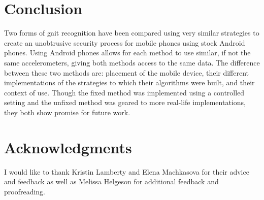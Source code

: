 \documentclass{sig-alternate}
\begin{document}
\section{Conclusion}
	Two forms of gait recognition have been compared using very similar strategies to create an unobtrusive security process for mobile phones using stock Android phones. Using Android phones allows for each method to use similar, if not the same accelerometers, giving both methods access to the same data. The difference between these two methods are: placement of the mobile device, their different implementations of the strategies to which their algorithms were built, and their context of use. Though the fixed method was implemented using a controlled setting and the unfixed method was geared to more real-life implementations, they both show promise for future work. 
\section{Acknowledgments}
	I would like to thank Kristin Lamberty and Elena Mach\-kasova for their advice and feedback as well as Melissa Helgeson for additional feedback and proofreading. 




  


%
%
\end{document}
